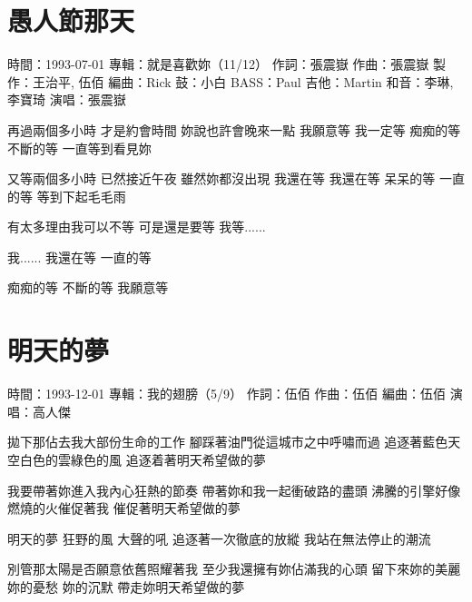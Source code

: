 \documentclass[UTF8,a4paper,oneside,twocolumn,12pt]{ctexbook}
\newcommand{\infopair}[2]{\textbullet #1：#2}
\newcommand{\zc}[1][伍佰]{\infopair{作詞}{#1}}
\newcommand{\zq}[1][伍佰]{\infopair{作曲}{#1}}
\newcommand{\bq}[1][伍佰]{\infopair{編曲}{#1}}
\newcommand{\zj}[1]{\infopair{專輯}{#1}}
\newcommand{\zz}[1]{\infopair{製作}{#1}}
\newcommand{\sj}[1]{\infopair{時間}{#1}}
\newenvironment{info}{\begin{flushleft}\kaishu
	}
	{\end{flushleft}\normalsize\yahei\par}
\newenvironment{lyric}{
	}
{}
\begin{document}
\section{愚人節那天}
\begin{info}
	\sj{1993-07-01}
	\zj{就是喜歡妳（11/12）}
	\zc[張震嶽]
	\zq[張震嶽]
	\zz{王治平, 伍佰}
	\bq[Rick]
	\infopair{鼓}{小白}
	\infopair{BASS}{Paul}
	\infopair{吉他}{Martin}
	\infopair{和音}{李琳, 李寶琦}
	\infopair{演唱}{張震嶽}
\end{info}
\begin{lyric}
	再過兩個多小時 才是約會時間
	妳說也許會晚來一點
	我願意等
	我一定等 痴痴的等 不斷的等
	一直等到看見妳

	又等兩個多小時 已然接近午夜
	雖然妳都沒出現
	我還在等
	我還在等 呆呆的等 一直的等
	等到下起毛毛雨

	有太多理由我可以不等
	可是還是要等
	我等......

	我......
	我還在等
	一直的等

	痴痴的等 不斷的等
	我願意等
\end{lyric}

\section{明天的夢}
\begin{info}
	\sj{1993-12-01}
	\zj{我的翅膀（5/9）}
	\zc
	\zq
	\bq
	\infopair{演唱}{高人傑}
\end{info}
\begin{lyric}
	拋下那佔去我大部份生命的工作
	腳踩著油門從這城市之中呼嘯而過
	追逐著藍色天空白色的雲綠色的風
	追逐着著明天希望做的夢

	我要帶著妳進入我內心狂熱的節奏
	帶著妳和我一起衝破路的盡頭
	沸騰的引擎好像燃燒的火催促著我
	催促著明天希望做的夢

	明天的夢 狂野的風 大聲的吼
	追逐著一次徹底的放縱
	我站在無法停止的潮流

	別管那太陽是否願意依舊照耀著我
	至少我還擁有妳佔滿我的心頭
	留下來妳的美麗 妳的憂愁 妳的沉默
	帶走妳明天希望做的夢
\end{lyric}
\end{document}
